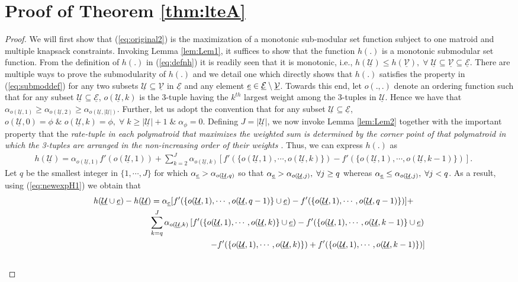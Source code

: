 \documentclass[11pt] {article}
\newcommand{\Uulc} {{\underline{\mathcal U}}}
\newcommand{\Vulc} {{\underline{\mathcal V}}}
\newcommand{\Eulc} {{\underline{\mathcal E}}}
\begin{document}
\section{Proof of Theorem \ref{thm:lteA}}\label{app:lteA}
\begin{proof} We will first show that (\ref{eq:original2}) is the maximization of a monotonic sub-modular set function subject to one matroid and multiple knapsack constraints. Invoking Lemma \ref{lem:Lem1}, it suffices to show that the function $h(.)$ is a monotonic submodular set function. From the definition of $h(.)$ in (\ref{eq:defnh}) it is readily seen that it is monotonic, i.e., $h(\Uulc)\leq h(\Vulc),\;\forall\;\Uulc\subseteq\Vulc\subseteq\Eulc$. There are multiple ways to prove the submodularity of $h(.)$ and we detail one which directly shows that $h(.)$ satisfies  the property in (\ref{eq:submoddef}) for any two subsets $\Uulc\subseteq\Vulc$ in $\Eulc$ and any
 element $\eul\in\Eulc\setminus\Vulc$. Towards this end,
let $o(.,.)$ denote an ordering function such that for any
 subset $\Uulc\subseteq\Eulc$, $o(\Uulc,k)$ is the 3-tuple having the $k^{th}$ largest weight among the 3-tuples in $\Uulc$. Hence we have that $\alpha_{o(\Uulc,1)}\geq \alpha_{o(\Uulc,2)}\geq  \alpha_{o(\Uulc,|\Uulc|)}$. Further, let us adopt the convention that for any subset $\Uulc\subseteq\Eulc$,
  $o(\Uulc,0)=\phi\;\&\;o(\Uulc,k)=\phi,\;\forall\;k\geq |\Uulc|+1\;\&\;\alpha_{\phi}=0$. Defining $J=|\Uulc|$,
    we now invoke Lemma \ref{lem:Lem2} together with the important property that the {\em rate-tuple in each polymatroid that maximizes the weighted sum is determined by the corner point of that polymatroid in which the 3-tuples are arranged in the non-increasing order of their weights \cite{edmonds:poly,tse:poly}}. Thus, we can express $h(.)$ as
\begin{eqnarray}\label{eq:newexpH1}
   h(\Uulc)=\alpha_{o(\Uulc,1)}f'(o(\Uulc,1))+\sum_{k=2}^{J}\alpha_{o(\Uulc,k)}[f'(\{o(\Uulc,1),\cdots,o(\Uulc,k)\})-f'(\{o(\Uulc,1),\cdots,o(\Uulc,k-1)\})]. \;\;\;\;\;
 \end{eqnarray}
 Let $q$ be the smallest integer in $\{1,\cdots,J\}$ for which $\alpha_{\eul}>\alpha_{o(\Uulc,q)}$ so that $\alpha_{\eul}>\alpha_{o(\Uulc,j)},\;\forall j\geq q$ whereas
   $\alpha_{\eul}\leq \alpha_{o(\Uulc,j)},\;\forall j< q$.
As a result, using (\ref{eq:newexpH1}) we obtain that
 \begin{eqnarray}\label{eq:newdiffuexp}
  \nonumber h(\Uulc\cup\eul)- h(\Uulc)=\alpha_{\eul}[f'(\{o(\Uulc,1),\cdots,o(\Uulc,q-1)\}\cup\eul)-f'(\{o(\Uulc,1),\cdots,o(\Uulc,q-1)\})] +\;\;\;\;\;\\   \nonumber \sum_{k=q}^{J}\alpha_{o(\Uulc,k)}\left[f'(\{o(\Uulc,1),\cdots,o(\Uulc,k)\}\cup\eul)-f'(\{o(\Uulc,1),\cdots,o(\Uulc,k-1)\}\cup\eul) \right.\\ \nonumber\left.   -f'(\{o(\Uulc,1),\cdots,o(\Uulc,k)\})+f'(\{o(\Uulc,1),\cdots,o(\Uulc,k-1)\})\right]\\\nonumber

\end{eqnarray}
\end{proof}
\end{document}

